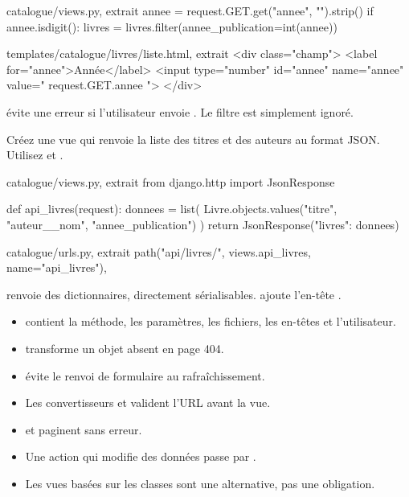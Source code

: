 \begin{correction}
\begin{codebox}[python]{catalogue/views.py, extrait}
annee = request.GET.get("annee", "").strip()
if annee.isdigit():
    livres = livres.filter(annee_publication=int(annee))
\end{codebox}

\begin{codebox}[html]{templates/catalogue/livres/liste.html, extrait}
<div class="champ">
  <label for="annee">Année</label>
  <input type="number" id="annee" name="annee" value="{{ request.GET.annee }}">
</div>
\end{codebox}

 évite une erreur  si l'utilisateur envoie
. Le filtre est simplement ignoré.
\end{correction}

\begin{exercice}
Créez une vue  qui renvoie la liste des titres et des auteurs
au format JSON. Utilisez  et .
\end{exercice}

\begin{correction}
\begin{codebox}[python]{catalogue/views.py, extrait}
from django.http import JsonResponse


def api_livres(request):
    donnees = list(
        Livre.objects.values("titre", "auteur__nom", "annee_publication")
    )
    return JsonResponse({"livres": donnees})
\end{codebox}

\begin{codebox}[python]{catalogue/urls.py, extrait}
path("api/livres/", views.api_livres, name="api_livres"),
\end{codebox}

 renvoie des dictionnaires, directement sérialisables.
 ajoute l'en-tête .
\end{correction}

\begin{retenir}
\begin{itemize}
  \item {} contient la méthode, les paramètres, les fichiers, les
        en-têtes et l'utilisateur.
  \item {} transforme un objet absent en page 404.
  \item {} évite le renvoi de formulaire au rafraîchissement.
  \item Les convertisseurs  et  valident l'URL avant la vue.
  \item {} et  paginent sans erreur.
  \item Une action qui modifie des données passe par .
  \item Les vues basées sur les classes sont une alternative, pas une obligation.
\end{itemize}
\end{retenir}
